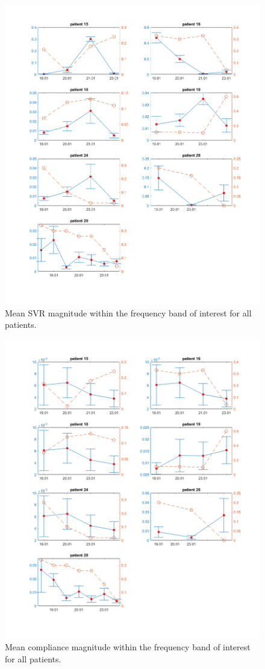 \begin{figure}[h]
    \centering
    \includegraphics[width=1\textwidth]{fig/results/resistance_dft_all.png}
    \caption{Mean SVR magnitude within the frequency band of interest for all patients.}
    \label{fig:resistance_dft_all}
\end{figure}{}

\begin{figure}[h]
    \centering
    \includegraphics[width=1\textwidth]{fig/results/compliance_dft_all.png}
    \caption{Mean compliance magnitude within the frequency band of interest for all patients.}
    \label{fig:compliance_dft_all}
\end{figure}{}

\cleardoublepage
